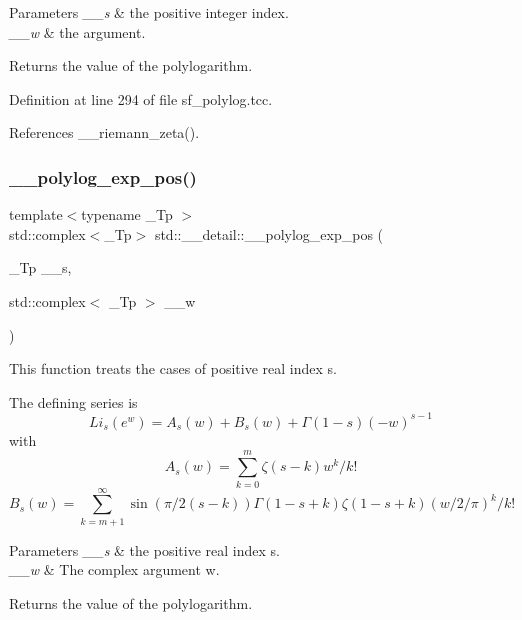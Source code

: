 \begin{DoxyParams}{Parameters}
{\em \+\_\+\+\_\+s} & the positive integer index. \\
\hline
{\em \+\_\+\+\_\+w} & the argument. \\
\hline
\end{DoxyParams}
\begin{DoxyReturn}{Returns}
the value of the polylogarithm. 
\end{DoxyReturn}


Definition at line 294 of file sf\+\_\+polylog.\+tcc.



References \+\_\+\+\_\+riemann\+\_\+zeta().

\mbox{\label{namespacestd_1_1____detail_a56b0f5bc6f4955469fd5f83105cbd466}} 
\subsubsection{\texorpdfstring{\+\_\+\+\_\+polylog\+\_\+exp\+\_\+pos()}{\_\_polylog\_exp\_pos()}\hspace{0.1cm}{\footnotesize\ttfamily [3/3]}}
{\footnotesize\ttfamily template$<$typename \+\_\+\+Tp $>$ \\
std\+::complex$<$\+\_\+\+Tp$>$ std\+::\+\_\+\+\_\+detail\+::\+\_\+\+\_\+polylog\+\_\+exp\+\_\+pos (\begin{DoxyParamCaption}\item[{\+\_\+\+Tp}]{\+\_\+\+\_\+s,  }\item[{std\+::complex$<$ \+\_\+\+Tp $>$}]{\+\_\+\+\_\+w }\end{DoxyParamCaption})}

This function treats the cases of positive real index s.

The defining series is \[ Li_s(e^w) = A_s(w) + B_s(w) + \Gamma(1-s)(-w)^{s-1} \] with \[ A_s(w) = \sum_{k=0}^{m} \zeta(s-k)w^k/k! \] \[ B_s(w) = \sum_{k=m+1}^{\infty} \sin(\pi/2(s-k)) \Gamma(1-s+k)\zeta(1-s+k) (w/2/\pi)^k/k! \]


\begin{DoxyParams}{Parameters}
{\em \+\_\+\+\_\+s} & the positive real index s. \\
\hline
{\em \+\_\+\+\_\+w} & The complex argument w. \\
\hline
\end{DoxyParams}
\begin{DoxyReturn}{Returns}
the value of the polylogarithm. 
\end{DoxyReturn}


